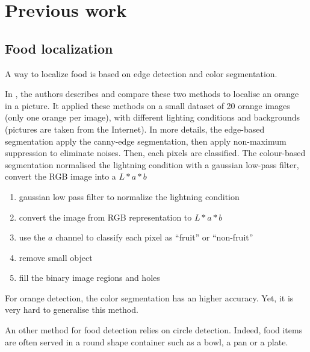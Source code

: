\chapter{Previous work} \label{sec:previous_work}
\section{Food localization}


A way to localize food is based on edge detection and color segmentation.

In \cite{Thendral2014a}, the authors describes and compare these two methods to localise an orange in a picture. It applied these methods on a small dataset of 20 orange images (only one orange per image), with different lighting conditions and backgrounds (pictures are taken from the Internet).
In more details, the edge-based segmentation apply the canny-edge segmentation, then apply non-maximum suppression to eliminate noises. Then, each pixels are classified.
The colour-based segmentation normalised the lightning condition with a gaussian low-pass filter, convert the RGB image into a $L * a * b$
\begin{enumerate}
    \item gaussian low pass filter to normalize the lightning condition
    \item convert the image from RGB representation to $L * a * b$
    \item use the $a$ channel to classify each pixel as \enquote{fruit} or \enquote{non-fruit}
    \item remove small object
    \item fill the binary image regions and holes
\end{enumerate}
For orange detection, the color segmentation has an higher accuracy. Yet, it is very hard to generalise this method.


An other method for food detection relies on circle detection. Indeed, food items are often served in a round shape container such as a bowl, a pan or a plate.

